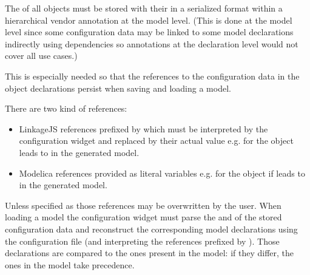\documentclass[letterpaper,10pt, openany,english]{sphinxmanual}
\begin{document}

The  of all objects must be stored with their  in a serialized format within a hierarchical vendor annotation at the model level. (This is done at the model level since some configuration data may be linked to some model declarations indirectly using dependencies so annotations at the declaration level would not cover all use cases.)

This is especially needed so that the references to the configuration data in the object declarations persist when saving and loading a model.

There are two kind of references:
\begin{itemize}
\item {} 
LinkageJS references prefixed by \sphinxcode{\sphinxupquote{\#}} which must be interpreted by the configuration widget and replaced by their actual value e.g.  for the object  leads to  in the generated model.

\item {} 
Modelica references provided as literal variables e.g.  for the object if  leads to  in the generated model.

\end{itemize}

Unless specified as  those references may be overwritten by the user. When loading a model the configuration widget must parse the  and  of the stored configuration data and reconstruct the corresponding model declarations using the configuration file (and interpreting the references prefixed by \sphinxcode{\sphinxupquote{\#}}). Those declarations are compared to the ones present in the model: if they differ, the ones in the model take precedence.

\end{document}

